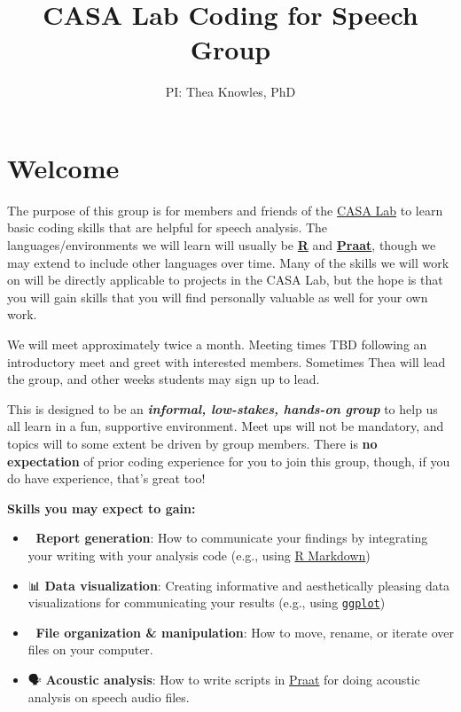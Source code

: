\documentclass[
]{book}
\title{CASA Lab Coding for Speech Group}
\author{PI: Thea Knowles, PhD}
\date{}
\providecommand{\tightlist}{%
  \setlength{\itemsep}{0pt}\setlength{\parskip}{0pt}}
\begin{document}
\frontmatter
\maketitle

{
\setcounter{tocdepth}{1}
\tableofcontents
}
\mainmatter
\hypertarget{welcome}{%
\chapter*{Welcome}\label{welcome}}

The purpose of this group is for members and friends of the \href{https://casa-lab.netlify.com}{CASA Lab} to learn basic coding skills that are helpful for speech analysis. The languages/environments we will learn will usually be \href{https://www.r-project.org/}{\textbf{R}} and \href{http://www.fon.hum.uva.nl/praat/}{\textbf{Praat}}, though we may extend to include other languages over time. Many of the skills we will work on will be directly applicable to projects in the CASA Lab, but the hope is that you will gain skills that you will find personally valuable as well for your own work.

We will meet approximately twice a month. Meeting times TBD following an introductory meet and greet with interested members. Sometimes Thea will lead the group, and other weeks students may sign up to lead.

This is designed to be an \textbf{\emph{informal, low-stakes, hands-on group}} to help us all learn in a fun, supportive environment. Meet ups will not be mandatory, and topics will to some extent be driven by group members. There is \textbf{no expectation} of prior coding experience for you to join this group, though, if you do have experience, that's great too!

\textbf{Skills you may expect to gain:}

\begin{itemize}
\tightlist
\item
  📝 \textbf{Report generation}: How to communicate your findings by integrating your writing with your analysis code (e.g., using \href{https://bookdown.org/yihui/rmarkdown/}{R Markdown})
\item
  📊 \textbf{Data visualization}: Creating informative and aesthetically pleasing data visualizations for communicating your results (e.g., using \href{https://ggplot2.tidyverse.org/reference/ggplot.html}{\texttt{ggplot}})
\item
  📂 \textbf{File organization \& manipulation}: How to move, rename, or iterate over files on your computer.
\item
  🗣 \textbf{Acoustic analysis}: How to write scripts in \href{http://www.fon.hum.uva.nl/praat/}{Praat} for doing acoustic analysis on speech audio files.
\end{itemize}
\end{document}
